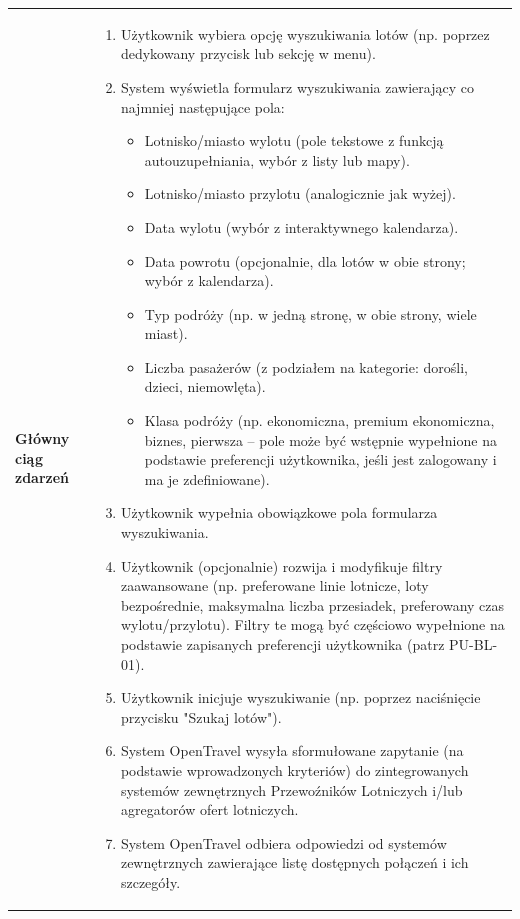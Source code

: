 \documentclass[a4paper,12pt]{article}
\begin{document}
\begin{longtable}{|p{\pierwszakolumnaszerokoscPUBLWyszukiwanie}|p{\drugakolumnaszerokoscPUBLWyszukiwanie}|}
    \hline
    \textbf{Główny ciąg zdarzeń} &
        \begin{enumerate} \itemsep0pt \parskip0pt \parsep0pt
            \item Użytkownik wybiera opcję wyszukiwania lotów (np. poprzez dedykowany przycisk lub sekcję w menu).
            \item System wyświetla formularz wyszukiwania zawierający co najmniej następujące pola:
                \begin{itemize} \itemsep0pt \parskip0pt \parsep0pt
                    \item Lotnisko/miasto wylotu (pole tekstowe z funkcją autouzupełniania, wybór z listy lub mapy).
                    \item Lotnisko/miasto przylotu (analogicznie jak wyżej).
                    \item Data wylotu (wybór z interaktywnego kalendarza).
                    \item Data powrotu (opcjonalnie, dla lotów w obie strony; wybór z kalendarza).
                    \item Typ podróży (np. w jedną stronę, w obie strony, wiele miast).
                    \item Liczba pasażerów (z podziałem na kategorie: dorośli, dzieci, niemowlęta).
                    \item Klasa podróży (np. ekonomiczna, premium ekonomiczna, biznes, pierwsza – pole może być wstępnie wypełnione na podstawie preferencji użytkownika, jeśli jest zalogowany i ma je zdefiniowane).
                \end{itemize}
            \item Użytkownik wypełnia obowiązkowe pola formularza wyszukiwania.
            \item Użytkownik (opcjonalnie) rozwija i modyfikuje filtry zaawansowane (np. preferowane linie lotnicze, loty bezpośrednie, maksymalna liczba przesiadek, preferowany czas wylotu/przylotu). Filtry te mogą być częściowo wypełnione na podstawie zapisanych preferencji użytkownika (patrz PU-BL-01).
            \item Użytkownik inicjuje wyszukiwanie (np. poprzez naciśnięcie przycisku "Szukaj lotów").
            \item System OpenTravel wysyła sformułowane zapytanie (na podstawie wprowadzonych kryteriów) do zintegrowanych systemów zewnętrznych Przewoźników Lotniczych i/lub agregatorów ofert lotniczych.
            \item System OpenTravel odbiera odpowiedzi od systemów zewnętrznych zawierające listę dostępnych połączeń i ich szczegóły.

\end{enumerate}
\end{longtable}
\end{document}
